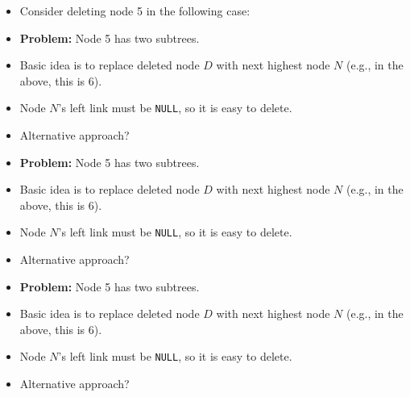 \documentclass[a4paper,12pt]{article}
\begin{document}
\begin{itemize}
    \item Consider deleting node 5 in the following case:
\end{itemize}

\begin{center}
\end{center}

\begin{itemize}
    \item \textbf{Problem:} Node 5 has two subtrees.
    \item Basic idea is to replace deleted node \(D\) with next highest node \(N\) (e.g., in the above, this is 6).
    \item Node \(N\)'s left link must be \texttt{NULL}, so it is easy to delete.
    \item Alternative approach?
\end{itemize}

\begin{itemize}
    \item \textbf{Problem:} Node 5 has two subtrees.
    \item Basic idea is to replace deleted node \(D\) with next highest node \(N\) (e.g., in the above, this is 6).
    \item Node \(N\)'s left link must be \texttt{NULL}, so it is easy to delete.
    \item Alternative approach?
\end{itemize}

\begin{itemize}
    \item \textbf{Problem:} Node 5 has two subtrees.
    \item Basic idea is to replace deleted node \(D\) with next highest node \(N\) (e.g., in the above, this is 6).
    \item Node \(N\)'s left link must be \texttt{NULL}, so it is easy to delete.
    \item Alternative approach?
\end{itemize}
\end{document}

